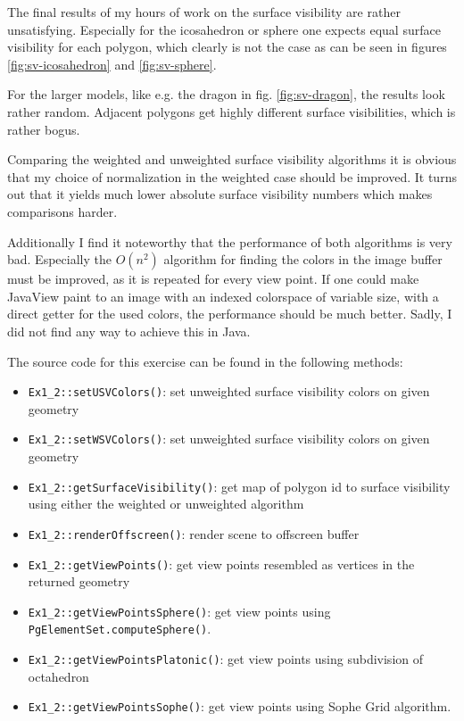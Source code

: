 \documentclass[a4paper,10pt,notitlepage]{scrreprt}
\begin{document}
The final results of my hours of work on the surface visibility are rather
unsatisfying. Especially for the icosahedron or sphere one expects equal
surface visibility for each polygon, which clearly is not the case as can be
seen in figures \ref{fig:sv-icosahedron} and \ref{fig:sv-sphere}.

For the larger models, like e.g. the dragon in fig. \ref{fig:sv-dragon}, the
results look rather random. Adjacent polygons get highly different surface
visibilities, which is rather bogus. 

Comparing the weighted and unweighted surface visibility algorithms it is
obvious that my choice of normalization in the weighted case should be
improved. It turns out that it yields much lower absolute surface visibility
numbers which makes comparisons harder.

Additionally I find it noteworthy that the performance of both algorithms is
very bad. Especially the $O(n^2)$ algorithm for finding the colors in the
image buffer must be improved, as it is repeated for every view point. If one
could make JavaView paint to an image with an indexed colorspace of variable
size, with a direct getter for the used colors, the performance should be much
better. Sadly, I did not find any way to achieve this in Java.

The source code for this exercise can be found in the following methods:

\begin{itemize}
 \item \texttt{Ex1\_2::setUSVColors()}: set unweighted surface visibility
colors on given geometry
 \item \texttt{Ex1\_2::setWSVColors()}: set unweighted surface visibility
colors on given geometry
 \item \texttt{Ex1\_2::getSurfaceVisibility()}: get map of polygon id to
surface visibility using either the weighted or unweighted algorithm
 \item \texttt{Ex1\_2::renderOffscreen()}: render scene to offscreen buffer
 \item \texttt{Ex1\_2::getViewPoints()}: get view points resembled as vertices
in the returned geometry
 \item \texttt{Ex1\_2::getViewPointsSphere()}: get view points using
\texttt{PgElementSet.computeSphere()}.
 \item \texttt{Ex1\_2::getViewPointsPlatonic()}: get view points using
subdivision of octahedron
 \item \texttt{Ex1\_2::getViewPointsSophe()}: get view points using Sophe Grid
algorithm.
\end{itemize}
\end{document}
